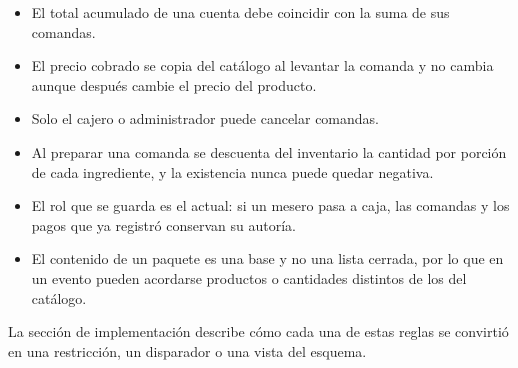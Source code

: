 \begin{itemize}
    \item El total acumulado de una cuenta debe coincidir con la suma de sus comandas.
    \item El precio cobrado se copia del catálogo al levantar la comanda y no cambia aunque después cambie el precio del producto.
    \item Solo el cajero o administrador puede cancelar comandas.
    \item Al preparar una comanda se descuenta del inventario la cantidad por porción de cada ingrediente, y la existencia nunca puede quedar negativa.
    \item El rol que se guarda es el actual: si un mesero pasa a caja, las comandas y los pagos que ya registró conservan su autoría.
    \item El contenido de un paquete es una base y no una lista cerrada, por lo que en un evento pueden acordarse productos o cantidades distintos de los del catálogo.
\end{itemize}

La sección de implementación describe cómo cada una de estas reglas se convirtió en una restricción, un disparador o una vista del esquema.
